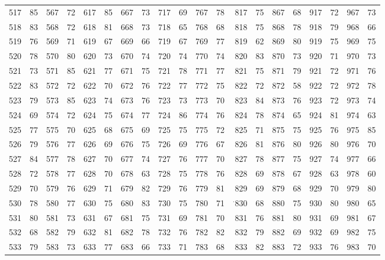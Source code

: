\begin{tabular}{@{}rr|rr|rr|rr|rr|rr|rr|rr|rr|rr@{}}
517 & 85 & 567 & 72 & 617 & 85 & 667 & 73 & 717 & 69 & 767 & 78 & 817 & 75 & 867 & 68 & 917 & 72 & 967 & 73 \\
518 & 83 & 568 & 72 & 618 & 81 & 668 & 73 & 718 & 65 & 768 & 68 & 818 & 75 & 868 & 78 & 918 & 79 & 968 & 66 \\
519 & 76 & 569 & 71 & 619 & 67 & 669 & 66 & 719 & 67 & 769 & 77 & 819 & 62 & 869 & 80 & 919 & 75 & 969 & 75 \\
520 & 78 & 570 & 80 & 620 & 73 & 670 & 74 & 720 & 74 & 770 & 74 & 820 & 83 & 870 & 73 & 920 & 71 & 970 & 73 \\[1pt]
521 & 73 & 571 & 85 & 621 & 77 & 671 & 75 & 721 & 78 & 771 & 77 & 821 & 75 & 871 & 79 & 921 & 72 & 971 & 76 \\
522 & 83 & 572 & 72 & 622 & 70 & 672 & 76 & 722 & 77 & 772 & 75 & 822 & 72 & 872 & 58 & 922 & 72 & 972 & 78 \\
523 & 79 & 573 & 85 & 623 & 74 & 673 & 76 & 723 & 73 & 773 & 70 & 823 & 84 & 873 & 76 & 923 & 72 & 973 & 74 \\
524 & 69 & 574 & 72 & 624 & 75 & 674 & 77 & 724 & 86 & 774 & 76 & 824 & 78 & 874 & 65 & 924 & 81 & 974 & 63 \\
525 & 77 & 575 & 70 & 625 & 68 & 675 & 69 & 725 & 75 & 775 & 72 & 825 & 71 & 875 & 75 & 925 & 76 & 975 & 85 \\
526 & 79 & 576 & 77 & 626 & 69 & 676 & 75 & 726 & 69 & 776 & 67 & 826 & 81 & 876 & 80 & 926 & 80 & 976 & 70 \\
527 & 84 & 577 & 78 & 627 & 70 & 677 & 74 & 727 & 76 & 777 & 70 & 827 & 78 & 877 & 75 & 927 & 74 & 977 & 66 \\
528 & 72 & 578 & 77 & 628 & 70 & 678 & 63 & 728 & 75 & 778 & 76 & 828 & 69 & 878 & 67 & 928 & 63 & 978 & 60 \\
529 & 70 & 579 & 76 & 629 & 71 & 679 & 82 & 729 & 76 & 779 & 81 & 829 & 69 & 879 & 68 & 929 & 70 & 979 & 80 \\
530 & 78 & 580 & 77 & 630 & 75 & 680 & 83 & 730 & 75 & 780 & 71 & \({}^{\mathord{\cdot}}\!830\) & 68 & 880 & 75 & 930 & 80 & 980 & 65 \\[1pt]
531 & 80 & 581 & 73 & 631 & 67 & 681 & 75 & 731 & 69 & 781 & 70 & 831 & 76 & 881 & 80 & 931 & 69 & 981 & 67 \\
532 & 68 & 582 & 79 & 632 & 81 & 682 & 78 & 732 & 76 & 782 & 82 & 832 & 79 & 882 & 69 & 932 & 69 & 982 & 75 \\
533 & 79 & 583 & 73 & 633 & 77 & 683 & 66 & 733 & 71 & 783 & 68 & 833 & 82 & 883 & 72 & 933 & 76 & 983 & 70 \\

\end{tabular}
